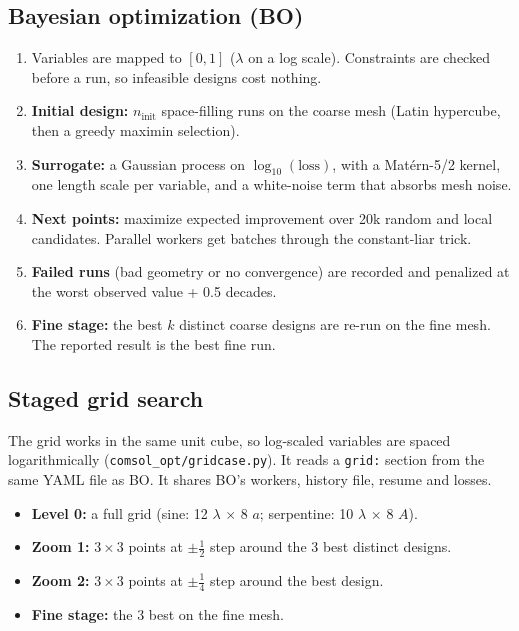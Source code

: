 \documentclass[11pt,a4paper]{article}
\begin{document}
\subsection{Bayesian optimization (BO)}
\begin{enumerate}
  \item Variables are mapped to $[0,1]$ ($\lambda$ on a log scale). Constraints are checked before
        a run, so infeasible designs cost nothing.
  \item \textbf{Initial design:} $n_\mathrm{init}$ space-filling runs on the coarse mesh (Latin
        hypercube, then a greedy maximin selection).
  \item \textbf{Surrogate:} a Gaussian process on $\log_{10}(\text{loss})$, with a Mat\'ern-5/2
        kernel, one length scale per variable, and a white-noise term that absorbs mesh noise.
  \item \textbf{Next points:} maximize expected improvement over 20k random and local candidates.
        Parallel workers get batches through the constant-liar trick.
  \item \textbf{Failed runs} (bad geometry or no convergence) are recorded and penalized at the
        worst observed value + 0.5 decades.
  \item \textbf{Fine stage:} the best $k$ distinct coarse designs are re-run on the fine mesh. The
        reported result is the best fine run.
\end{enumerate}

\subsection{Staged grid search}
The grid works in the same unit cube, so log-scaled variables are spaced logarithmically
(\texttt{comsol\_opt/gridcase.py}). It reads a \texttt{grid:} section from the same YAML file
as BO. It shares BO's workers, history file, resume and losses.
\begin{itemize}
  \item \textbf{Level 0:} a full grid (sine: 12 $\lambda$ $\times$ 8 $a$; serpentine: 10 $\lambda$ $\times$ 8 $A$).
  \item \textbf{Zoom 1:} $3\times3$ points at $\pm\tfrac12$ step around the 3 best distinct designs.
  \item \textbf{Zoom 2:} $3\times3$ points at $\pm\tfrac14$ step around the best design.
  \item \textbf{Fine stage:} the 3 best on the fine mesh.
\end{itemize}
\end{document}
